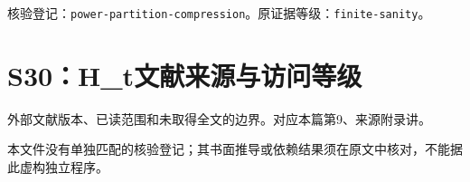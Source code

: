 核验登记：{\small\nolinkurl{power-partition-compression}}。原证据等级：{\small\nolinkurl{finite-sanity}}。

\section{S30：H\_t文献来源与访问等级}\label{source:S30}

外部文献版本、已读范围和未取得全文的边界。对应本篇第9、来源附录讲。

\par{}\par

本文件没有单独匹配的核验登记；其书面推导或依赖结果须在原文中核对，不能据此虚构独立程序。
